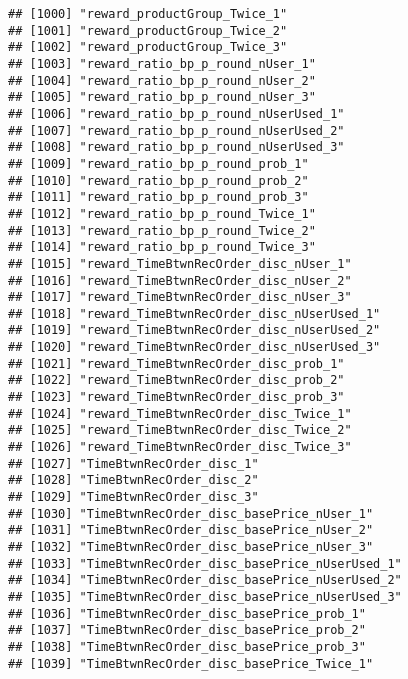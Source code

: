 \documentclass[10pt]{report}
\begin{document}
\begin{verbatim}
## [1000] "reward_productGroup_Twice_1"                          
## [1001] "reward_productGroup_Twice_2"                          
## [1002] "reward_productGroup_Twice_3"                          
## [1003] "reward_ratio_bp_p_round_nUser_1"                      
## [1004] "reward_ratio_bp_p_round_nUser_2"                      
## [1005] "reward_ratio_bp_p_round_nUser_3"                      
## [1006] "reward_ratio_bp_p_round_nUserUsed_1"                  
## [1007] "reward_ratio_bp_p_round_nUserUsed_2"                  
## [1008] "reward_ratio_bp_p_round_nUserUsed_3"                  
## [1009] "reward_ratio_bp_p_round_prob_1"                       
## [1010] "reward_ratio_bp_p_round_prob_2"                       
## [1011] "reward_ratio_bp_p_round_prob_3"                       
## [1012] "reward_ratio_bp_p_round_Twice_1"                      
## [1013] "reward_ratio_bp_p_round_Twice_2"                      
## [1014] "reward_ratio_bp_p_round_Twice_3"                      
## [1015] "reward_TimeBtwnRecOrder_disc_nUser_1"                 
## [1016] "reward_TimeBtwnRecOrder_disc_nUser_2"                 
## [1017] "reward_TimeBtwnRecOrder_disc_nUser_3"                 
## [1018] "reward_TimeBtwnRecOrder_disc_nUserUsed_1"             
## [1019] "reward_TimeBtwnRecOrder_disc_nUserUsed_2"             
## [1020] "reward_TimeBtwnRecOrder_disc_nUserUsed_3"             
## [1021] "reward_TimeBtwnRecOrder_disc_prob_1"                  
## [1022] "reward_TimeBtwnRecOrder_disc_prob_2"                  
## [1023] "reward_TimeBtwnRecOrder_disc_prob_3"                  
## [1024] "reward_TimeBtwnRecOrder_disc_Twice_1"                 
## [1025] "reward_TimeBtwnRecOrder_disc_Twice_2"                 
## [1026] "reward_TimeBtwnRecOrder_disc_Twice_3"                 
## [1027] "TimeBtwnRecOrder_disc_1"                              
## [1028] "TimeBtwnRecOrder_disc_2"                              
## [1029] "TimeBtwnRecOrder_disc_3"                              
## [1030] "TimeBtwnRecOrder_disc_basePrice_nUser_1"              
## [1031] "TimeBtwnRecOrder_disc_basePrice_nUser_2"              
## [1032] "TimeBtwnRecOrder_disc_basePrice_nUser_3"              
## [1033] "TimeBtwnRecOrder_disc_basePrice_nUserUsed_1"          
## [1034] "TimeBtwnRecOrder_disc_basePrice_nUserUsed_2"          
## [1035] "TimeBtwnRecOrder_disc_basePrice_nUserUsed_3"          
## [1036] "TimeBtwnRecOrder_disc_basePrice_prob_1"               
## [1037] "TimeBtwnRecOrder_disc_basePrice_prob_2"               
## [1038] "TimeBtwnRecOrder_disc_basePrice_prob_3"               
## [1039] "TimeBtwnRecOrder_disc_basePrice_Twice_1"              

\end{verbatim}
\end{document}
